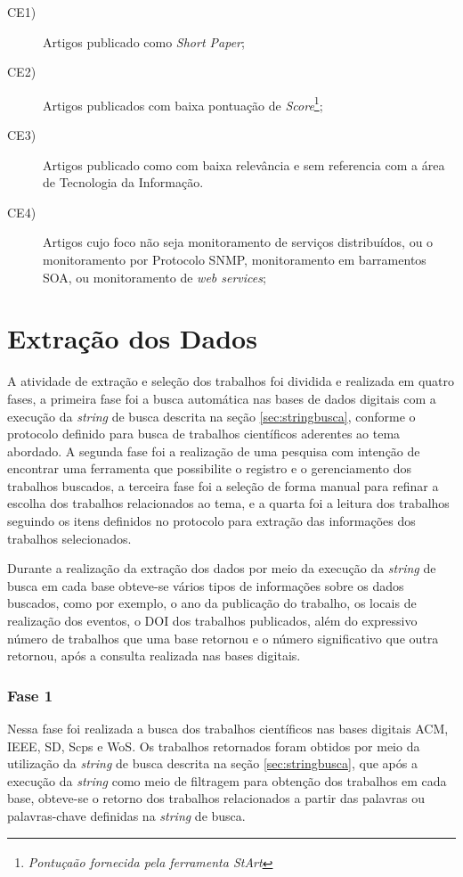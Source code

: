 \begin{description}
\item[CE1)]Artigos publicado como \textit{Short Paper};
\item[CE2)]Artigos publicados com baixa pontuação de \textit{Score}\footnote{\textit{Pontuçaão fornecida pela ferramenta \acrshort{StArt}\textsuperscript{\textregistered}}};
\item[CE3)] Artigos publicado como com baixa relevância e sem referencia com a área de Tecnologia da Informação.
\item[CE4)]Artigos cujo foco não seja monitoramento de serviços distribuídos, ou o monitoramento por Protocolo \acrshort{SNMP}, monitoramento em barramentos \acrshort{SOA}, ou monitoramento de \textit{web services};
\end{description}



\section{Extração dos Dados}
A atividade de extração e seleção dos trabalhos foi dividida e realizada em quatro fases, a primeira fase foi a busca automática nas bases de dados digitais com a execução da \textit{string} de busca descrita na seção \ref{sec:stringbusca}, conforme o protocolo definido para busca de trabalhos científicos aderentes ao tema abordado. A segunda fase foi a realização de uma pesquisa com intenção de encontrar uma ferramenta que possibilite o registro e o gerenciamento dos trabalhos buscados, a terceira fase foi a seleção de forma manual para refinar a escolha dos trabalhos relacionados ao tema, e a quarta foi a leitura dos trabalhos seguindo os itens definidos no protocolo para extração das informações dos trabalhos selecionados. 

Durante a realização da extração dos dados por meio da execução da \textit{string} de busca em cada base obteve-se vários tipos de informações sobre os dados buscados, como por exemplo, o ano da publicação do trabalho, os locais de realização dos eventos, o \acrshort{DOI} dos trabalhos publicados, além do  expressivo número de trabalhos que uma base retornou e o número significativo que outra retornou, após a consulta realizada nas bases digitais.

\subsubsection{Fase 1}
Nessa fase foi realizada a busca dos trabalhos científicos nas bases digitais \acrlong{ACM}, \acrlong{IEEE}, \acrlong{SD}, \acrlong{Scps} e \acrlong{WoS}. Os trabalhos retornados foram obtidos por meio da utilização da \textit{string} de busca descrita na seção \ref{sec:stringbusca}, que após a execução da \textit{string} como meio de filtragem para obtenção dos trabalhos em cada base, obteve-se o retorno dos trabalhos relacionados a partir das palavras ou palavras-chave definidas na \textit{string} de busca. 

